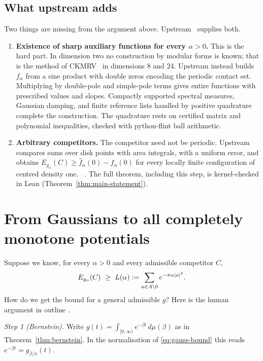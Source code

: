 \subsection{What upstream adds}

Two things are missing from the argument above. Upstream~\cite{oai} supplies both.
\begin{enumerate}
\item \textbf{Existence of sharp auxiliary functions for every $\alpha>0$.} This is the hard part. In dimension two no
construction by modular forms is known; that is the method of CKMRV~\cite{ckmrv} in dimensions 8 and 24. Upstream
instead builds $f_\alpha$ from a sine product with double zeros encoding the periodic contact set. Multiplying by
double-pole and simple-pole terms gives entire functions with prescribed values and slopes. Compactly supported
spectral measures, Gaussian damping, and finite reference lists handled by positive quadrature complete the
construction. The quadrature rests on certified matrix and polynomial inequalities, checked with python-flint ball
arithmetic. \tierL{}~\cite{oai}
\item \textbf{Arbitrary competitors.} The competitor need not be periodic. Upstream compares sums over disk points with
area integrals, with a uniform error, and obtains $E_{g_\alpha}(C)\ge\widehat f_\alpha(0)-f_\alpha(0)$ for every locally
finite configuration of centred density one. \tierL{}~\cite{oai}. The full theorem, including this step, is
kernel-checked in Lean \tierA{} (Theorem~\ref{thm:main-statement}).
\end{enumerate}

\section{From Gaussians to all completely monotone potentials}
\label{sec:mixtures}

Suppose we know, for every $\alpha>0$ and every admissible competitor $C$,
\begin{equation}\label{eq:gauss-bound}
  E_{g_\alpha}(C)\ \ge\ L(\alpha):=\sum_{a\in\Lat\setminus0}e^{-\pi\alpha|a|^2}.
\end{equation}
How do we get the bound for a general admissible $g$? Here is the human argument in outline \tierC{}.

\emph{Step 1 (Bernstein).} Write $g(t)=\int_{[0,\infty)}e^{-\beta t}\,d\mu(\beta)$ as in Theorem~\ref{thm:bernstein}.
In the normalisation of \eqref{eq:gauss-bound} this reads $e^{-\beta t}=g_{\beta/\pi}(t)$.

